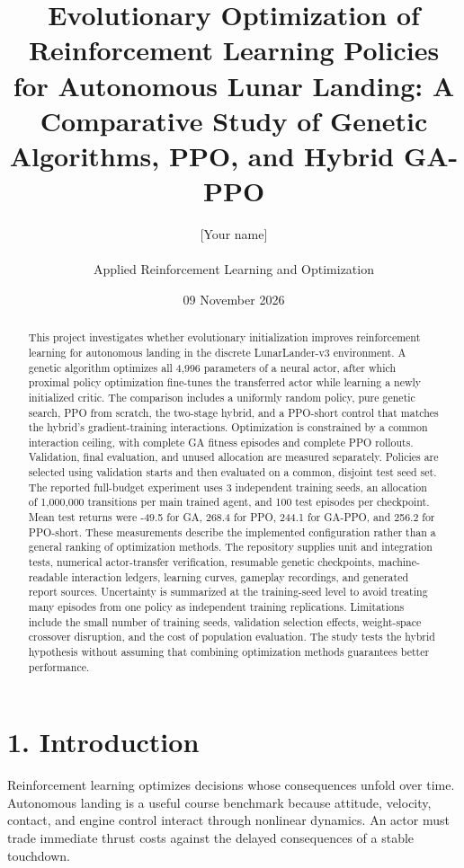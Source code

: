 \documentclass[11pt,a4paper]{article}
\title{Evolutionary Optimization of Reinforcement Learning Policies for Autonomous Lunar Landing: A Comparative Study of Genetic Algorithms, PPO, and Hybrid GA-PPO}
\author{[Your name] \\ [Your institution] \\ Applied Reinforcement Learning and Optimization}
\date{09 November 2026}
\begin{document}
\maketitle
\begin{abstract}
This project investigates whether evolutionary initialization improves reinforcement learning for autonomous landing in the discrete LunarLander-v3 environment. A genetic algorithm optimizes all 4,996 parameters of a neural actor, after which proximal policy optimization fine-tunes the transferred actor while learning a newly initialized critic. The comparison includes a uniformly random policy, pure genetic search, PPO from scratch, the two-stage hybrid, and a PPO-short control that matches the hybrid's gradient-training interactions. Optimization is constrained by a common interaction ceiling, with complete GA fitness episodes and complete PPO rollouts. Validation, final evaluation, and unused allocation are measured separately. Policies are selected using validation starts and then evaluated on a common, disjoint test seed set. The reported full-budget experiment uses 3 independent training seeds, an allocation of 1,000,000 transitions per main trained agent, and 100 test episodes per checkpoint. Mean test returns were -49.5 for GA, 268.4 for PPO, 244.1 for GA-PPO, and 256.2 for PPO-short. These measurements describe the implemented configuration rather than a general ranking of optimization methods. The repository supplies unit and integration tests, numerical actor-transfer verification, resumable genetic checkpoints, machine-readable interaction ledgers, learning curves, gameplay recordings, and generated report sources. Uncertainty is summarized at the training-seed level to avoid treating many episodes from one policy as independent training replications. Limitations include the small number of training seeds, validation selection effects, weight-space crossover disruption, and the cost of population evaluation. The study tests the hybrid hypothesis without assuming that combining optimization methods guarantees better performance.
\end{abstract}
\newpage
\tableofcontents
\newpage
\section*{1. Introduction}
Reinforcement learning optimizes decisions whose consequences unfold over time. Autonomous landing is a useful course benchmark because attitude, velocity, contact, and engine control interact through nonlinear dynamics. An actor must trade immediate thrust costs against the delayed consequences of a stable touchdown.
\end{document}
